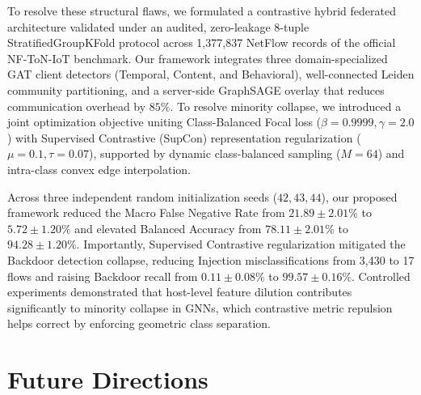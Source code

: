 \documentclass[12pt,a4paper]{report}
\begin{document}
To resolve these structural flaws, we formulated a contrastive hybrid federated architecture validated under an audited, zero-leakage 8-tuple StratifiedGroupKFold protocol across 1,377,837 NetFlow records of the official NF-ToN-IoT benchmark. Our framework integrates three domain-specialized GAT client detectors (Temporal, Content, and Behavioral), well-connected Leiden community partitioning, and a server-side GraphSAGE overlay that reduces communication overhead by $85\%$. To resolve minority collapse, we introduced a joint optimization objective uniting Class-Balanced Focal loss ($\beta = 0.9999, \gamma = 2.0$) with Supervised Contrastive (SupCon) representation regularization ($\mu = 0.1, \tau = 0.07$), supported by dynamic class-balanced sampling ($M = 64$) and intra-class convex edge interpolation.

Across three independent random initialization seeds ($42, 43, 44$), our proposed framework reduced the Macro False Negative Rate from $21.89 \pm 2.01\%$ to $5.72 \pm 1.20\%$ and elevated Balanced Accuracy from $78.11 \pm 2.01\%$ to $94.28 \pm 1.20\%$. Importantly, Supervised Contrastive regularization mitigated the Backdoor detection collapse, reducing Injection misclassifications from 3,430 to 17 flows and raising Backdoor recall from $0.11 \pm 0.08\%$ to $99.57 \pm 0.16\%$. Controlled experiments demonstrated that host-level feature dilution contributes significantly to minority collapse in GNNs, which contrastive metric repulsion helps correct by enforcing geometric class separation.

\section{Future Directions}\label{sec:future_directions}
\end{document}
